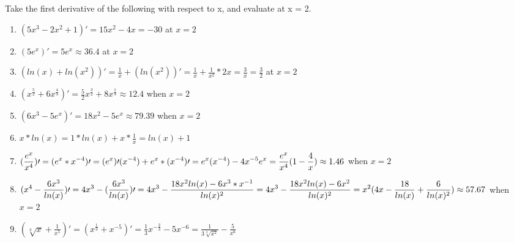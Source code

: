 \documentclass [12pt] {article}
\begin{document}
\bigskip
Take the first derivative of the following with respect to x, and evaluate at x = 2.
\begin{enumerate}
    \item $(5x^3 - 2x^2 +1)\prime = 15x^2 - 4x = -30 $  at $x = 2$
    \item $(5e^x) \prime = 5e^x \approx 36.4$  at $x = 2$
    \item $ \displaystyle (ln(x) + ln (x^2)) \prime = \frac{1}{x} + (ln(x^2))\prime = \frac{1}{x}+ \frac{1}{x^2} * 2x = \frac{3}{x} = \frac{3}{2}$ at $x=2$
    \item $ (x^{\frac{5}{2}} + 6x^{\frac{4}{3}}) \prime = \frac{5}{2}x^{\frac{3}{2}} + 8x^{\frac{1}{3}} \approx 12.4 $  when $x=2$
    \item $ (6x^3 - 5e^x) \prime = 18x^2 -5e^x \approx 79.39$ when $x=2$
    \item $ \displaystyle x*ln(x) = 1*ln(x) + x* \frac{1}{x} = ln (x) +1$
    \item $ \displaystyle (\frac{e^x}{x^4})\prime = (e^x * x^{-4})\prime\\= (e^x)\prime (x^{-4}) +e^x*(x^{-4})\prime \\=  e^x(x^{-4}) -4x^{-5}e^x \\ ={ \frac{e^x}{x^4}(1-\frac{4}{x})}  \\ \approx 1.46 $ when $x=2$
    \item  $ \displaystyle (x^4 - \frac{6x^3}{ln(x)})\prime \\ = 4x^3 - { (\frac{6x^3}{ln(x)})} \prime \\ = 4x^3 - { \frac{18x^2 ln(x) -6x^3 *x ^ {-1}}{ln(x) ^2} } \\ = 4x^3 - { \frac{18x^2 ln(x) -6x^2}{ln(x) ^2} } \\ =  x^2 (4x - \frac{18}{ln(x)} + \frac{6}{ln(x) ^2})\approx 57.67  $ when $x=2$
    \item $ \displaystyle (\sqrt[3]{x} + \frac{1}{x^5}) \prime = (x^{\frac{1}{3}} + x^{-5}) \prime = \frac{1}{3}x^{-\frac{2}{3}} - 5x^ {-6} = {\frac{1}{3 \sqrt[3]{x^2}}}-\frac{5}{x^6} $
    
\end{enumerate}

\newpage
\end{document}
